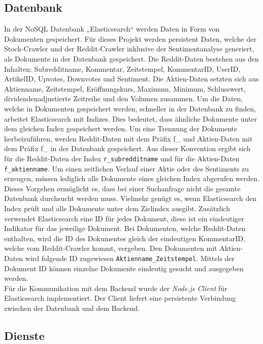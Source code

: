 \documentclass[a4paper, 10pt, conference]{IEEEtran}
\begin{document}
\subsection{Datenbank} \label{sub:database}
In der NoSQL Datenbank „Elasticsearch“ \cite{elasticsearch} werden Daten in Form von Dokumenten gespeichert. Für dieses Projekt werden persistent Daten, welche der Stock-Crawler und der Reddit-Crawler inklusive der Sentimentanalyse generiert, als Dokumente in der Datenbank gespeichert. Die Reddit-Daten bestehen aus den Inhalten: Subredditname, Kommentar, Zeitstempel, KommentarID, UserID, ArtikelID, Upvotes, Downvotes und Sentiment. Die Aktien-Daten setzten sich aus Aktienname, Zeitstempel, Eröffnungskurs, Maximum, Minimum, Schlusswert, dividendenadjustierte Zeitreihe und den Volumen zusammen. Um die Daten, welche in Dokumenten gespeichert werden, schneller in der Datenbank zu finden, arbeitet Elasticsearch mit Indizes. Dies bedeutet, dass ähnliche Dokumente unter dem gleichen Index gespeichert werden. Um eine Trennung der Dokumente herbeizuführen, werden Reddit-Daten mit dem Präfix f\_ und Aktien-Daten mit dem Präfix f\_ in der Datenbank gespeichert. Aus dieser Konvention ergibt sich für die Reddit-Daten der Index \texttt{\/r\_subredditname} und für die Aktien-Daten \texttt{\/f\_aktienname}. Um einen zeitlichen Verlauf einer Aktie oder des Sentiments zu erzeugen, müssen lediglich alle Dokumente eines gleichen Index abgerufen werden. Dieses Vorgehen ermöglicht es, dass bei einer Suchanfrage nicht die gesamte Datenbank durchsucht werden muss. Vielmehr genügt es, wenn Elasticsearch den Index prüft und alle Dokumente unter dem Zielindex ausgibt. Zusätzlich verwendet Elasticsearch eine ID für jedes Dokument, diese ist ein eindeutiger Indikator für das jeweilige Dokument. Bei Dokumenten, welche Reddit-Daten enthalten, wird die ID des Dokumentes gleich der eindeutigen KommentarID, welche vom Reddit-Crawler kommt, vergeben. Den Dokumenten mit Aktien-Daten wird folgende ID zugewiesen \texttt{\/Aktienname\_Zeitstempel}. Mittels der Dokument ID können einzelne Dokumente eindeutig gesucht und ausgegeben werden.\\
Für die Kommunikation mit dem Backend wurde der \textit{Node.js Client} für Elasticsearch implementiert. Der Client liefert eine persistente Verbindung zwischen der Datenbank und dem Backend.

\subsection{Dienste} \label{sub:services}
\end{document}
